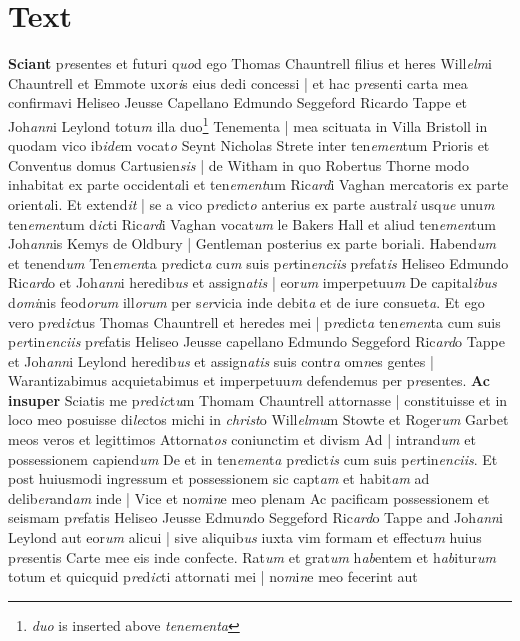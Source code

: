 \documentclass[a4paper,12pt]{article}
\begin{document}
\section*{Text}
\begin{sloppypar}
\textbf{Sciant} p\textit{re}sentes et futuri q\textit{uo}d ego Thomas Chauntrell filius et heres Will\textit{elm}i Chauntrell et Emmote ux\textit{o}r\textit{i}s eius dedi concessi | et hac p\textit{re}senti carta mea confirmavi Heliseo Jeusse Capellano Edmundo Seggeford Ricardo Tappe et Joh\textit{ann}i Leylond totu\textit{m} illa duo\footnote{\textit{duo} is inserted above \textit{tenementa}} Tenementa | mea scituata in Villa Bristoll in quodam vico ib\textit{ide}m vocat\textit{o} Seynt Nicholas Strete inter ten\textit{emen}tum Prioris et Conventus domus Cartusien\textit{sis} | de Witham in quo Robertus Thorne modo inhabitat ex parte occident\textit{a}li et ten\textit{ement}um Ric\textit{ard}i Vaghan mercatoris ex parte orient\textit{a}li. Et extend\textit{it} | se a vico p\textit{re}dict\textit{o} anterius ex parte austral\textit{i} usq\textit{ue} unu\textit{m} ten\textit{emen}tum d\textit{ic}ti Ric\textit{ard}i Vaghan vocat\textit{um} le Bakers Hall et aliud ten\textit{emen}tum Joh\textit{ann}is Kemys de Oldbury | Gentleman posterius ex parte boriali. Habend\textit{um} et tenend\textit{um} Ten\textit{emen}ta p\textit{re}dict\textit{a} cu\textit{m} suis p\textit{er}tin\textit{enciis} p\textit{re}fat\textit{is} Heliseo Edmundo Ric\textit{ard}o et Joh\textit{ann}i heredib\textit{us} et assign\textit{atis} | eor\textit{um} imperpetuu\textit{m} De capital\textit{ibus} d\textit{omi}nis feod\textit{orum} ill\textit{orum} per s\textit{er}vicia inde debit\textit{a} et de iure consuet\textit{a}. Et ego vero p\textit{re}d\textit{ic}tus Thomas Chauntrell et heredes mei | p\textit{re}dict\textit{a} ten\textit{emen}ta cum suis p\textit{er}tin\textit{enciis} p\textit{re}fatis Heliseo Jeusse capellano Edmundo Seggeford Ric\textit{ard}o Tappe et Joh\textit{ann}i Leylond heredib\textit{us} et assign\textit{atis} suis contr\textit{a} om\textit{n}es gentes | Warantizabimus acquietabimus et imperpetuu\textit{m} defendemus per p\textit{re}sentes. \textbf{Ac insuper} Sciatis me p\textit{re}d\textit{ic}t\textit{u}m Thomam Chauntrell attornasse | constituisse et in loco meo posuisse di\textit{le}ctos michi in \textit{christ}o Will\textit{elmu}m Stowte et Roger\textit{um} Garbet meos veros et legittimos Attornat\textit{os} coniunctim et divism Ad | intrand\textit{um} et possessionem capiend\textit{um} De et in ten\textit{emen}t\textit{a} p\textit{re}dict\textit{is} cum suis p\textit{er}tin\textit{enciis}. Et post huiusmodi ingressum et possessionem sic capt\textit{am} et habit\textit{am} ad delib\textit{er}and\textit{am} inde | Vice et no\textit{m}i\textit{n}e meo plenam Ac pacificam possessionem et seismam p\textit{re}fatis Heliseo Jeusse Edmu\textit{n}do Seggeford Ric\textit{ard}o Tappe and Joh\textit{ann}i Leylond aut eor\textit{um} alicui | sive aliquib\textit{us} iuxta vim formam et effectu\textit{m} huius p\textit{re}sentis Carte mee eis inde confecte. Rat\textit{um} et grat\textit{um} h\textit{ab}entem et h\textit{ab}itur\textit{um} totum et quicquid p\textit{re}d\textit{ic}ti attornati mei | no\textit{m}i\textit{n}e meo fecerint aut 
\end{sloppypar}
\end{document}
